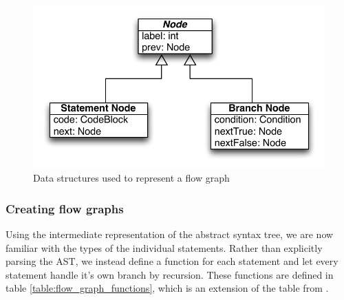 \begin{figure}[h]
	\centering
	\includegraphics[scale=1.0]{../img/flow_graph}
	\caption{Data structures used to represent a flow graph}
	\label{fig:flowgraph}
\end{figure}

\subsubsection{Creating flow graphs}\label{section:CreatingFlowGraphs}
Using the intermediate representation of the abstract syntax tree, we are now familiar with the types of the individual statements. Rather than explicitly parsing the AST, we instead define a function for each statement and let every statement handle it's own branch by recursion. These functions are defined in table \ref{table:flow_graph_functions}, which is an extension of the table from \cite{02242_slides}.

